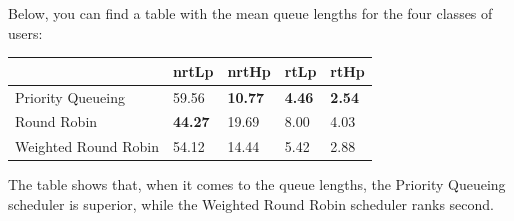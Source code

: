 \documentclass[12pt]{article}
\begin{document}
        Below, you can find a table with the mean queue lengths for the four classes of users:
        \begin{table}[htbp!]
            \centering
            \begin{tabular}{l|l|l|l|l|}
                \cline{2-5}
                                                        & nrtLp          & nrtHp          & rtLp          & rtHp          \\ \hline
                \multicolumn{1}{|l|}{Priority Queueing}    & 59.56          & \textbf{10.77} & \textbf{4.46} & \textbf{2.54} \\ \hline
                \multicolumn{1}{|l|}{Round Robin}          & \textbf{44.27} & 19.69          & 8.00          & 4.03          \\ \hline
                \multicolumn{1}{|l|}{Weighted Round Robin} & 54.12          & 14.44          & 5.42          & 2.88          \\ \hline
            \end{tabular}
        \end{table}
        
        The table shows that, when it comes to the queue lengths, the Priority Queueing scheduler is superior, while the Weighted Round Robin scheduler ranks second.
\end{document}
